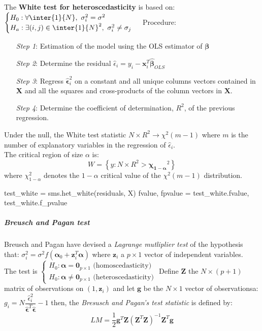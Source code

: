 The \textbf{White test for heteroscedasticity} is based on: 
$\begin{cases}
	H_{0}:\forall\inter{1}{N},~\sigma_{i}^{2}=\sigma^{2}\\
	H_{a}:\exists(i,j)\in\inter{1}{N}^{2},~\sigma_{i}^{2}\neq\sigma_{j}
\end{cases}
$
Procedure:
\begin{itemize}
	\item[\textit{Step 1}:] Estimation of the model using the OLS estimator of $\bm{\beta}$
	\item[\textit{Step 2}:] Determine the residual $\hat{\epsilon}_{i}=y_{i}-\bm{x}_{i}^{T}
		\hat{\bm{\beta}}_{OLS}$
	\item[\textit{Step 3}:] Regress $\hat{\bm{\epsilon}}_{i}^{2}$ on a constant and all unique
		columns vectors contained in $\bm{X}$ and all the squares and cross-products of
		the column vectors in $\bm{X}$.

	\item[\textit{Step 4}:] Determine the coefficient of determination, $R^{2}$, of the previous regression.
\end{itemize}
Under the null, the White test statistic $N\times R^{2}\rightarrow\chi^{2}(m-1)$ where $m$ is
the number of explanatory variables in the regression of $\hat{\epsilon}_{i}$.\\
The critical region of size $\alpha$ is:
$$ W = \left\{y:N\times R^{2}>\bm{\chi_{1-\alpha}}^{2}\right\}$$ where $\chi_{1-\alpha}^{2}$
denotes the $1-\alpha$ critical value of the $\chi^{2}(m-1)$ distribution.

\begin{python}
test_white = sms.het_white(residuals, X)
fvalue, fpvalue = test_white.fvalue, test_white.f_pvalue
\end{python}

\subparagraph{Breusch and Pagan test}
Breusch and Pagan have devised a \emph{Lagrange mutliplier test} of the hypothesis that:
$\sigma_{i}^{2}=\sigma^{2}f\left(\bm{\alpha}_{0}+\bm{z}_{i}^{T}\bm{\alpha}\right)$ where 
$\bm{z}_{i}$ a $p\times 1$ vector of independent variables.\\
The test is 
$
\begin{cases}
	H_{0}: \bm{\alpha}=\bm{0}_{p\times 1}\text{ (homoscedasticity)}\\
	H_{0}: \bm{\alpha}\neq\bm{0}_{p\times 1}\text{ (heteroscedasticity)}
\end{cases}
$
Define $\bm{Z}$ the $N\times(p+1)$ matrix of observations on $(1, \bm{z}_{i})$ and let $\bm{g}$
be the $N\times 1$ vector of observationsa: $g_{i}=N\dfrac{\hat{\epsilon}_{i}^{2}}{\hat{\bm{
\epsilon}}^{T}\hat{\bm{\epsilon}}}-1$
then, the \emph{Bresusch  and Pagan's test statistic} is defined by:
$$ LM = \dfrac{1}{2}\bm{g}^{T}\bm{Z}\left(\bm{Z}^{T}\bm{Z}\right)^{-1}\bm{Z}^{T}\bm{g}$$


